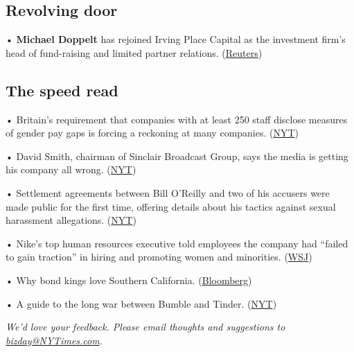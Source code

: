 \hypertarget{revolving-door}{%
\subsection{Revolving door}\label{revolving-door}}

• \textbf{Michael Doppelt} has rejoined Irving Place Capital as the
investment firm's head of fund-raising and limited partner relations.
(\href{https://www.reuters.com/article/us-irving-place-capital-moves-michael-do/irving-place-capital-names-fundraising-and-lp-relations-head-idUSKCN1HB21Q}{Reuters})

\hypertarget{the-speed-read}{%
\subsection{The speed read}\label{the-speed-read}}

• Britain's requirement that companies with at least 250 staff disclose
measures of gender pay gaps is forcing a reckoning at many companies.
(\href{https://www.nytimes3xbfgragh.onion/2018/04/04/business/britain-gender-pay-gap.html}{NYT})

• David Smith, chairman of Sinclair Broadcast Group, says the media is
getting his company all wrong.
(\href{https://www.nytimes3xbfgragh.onion/2018/04/04/business/media/sinclairs-boss-responds-to-criticism-you-cant-be-serious.html}{NYT})

• Settlement agreements between Bill O'Reilly and two of his accusers
were made public for the first time, offering details about his tactics
against sexual harassment allegations.
(\href{https://www.nytimes3xbfgragh.onion/2018/04/04/business/media/how-bill-oreilly-silenced-his-accusers.html}{NYT})

• Nike's top human resources executive told employees the company had
``failed to gain traction'' in hiring and promoting women and
minorities.
(\href{https://www.wsj.com/articles/nikes-hr-chief-says-company-fails-to-promote-enough-women-minoritiesmemo-1522871805}{WSJ})

• Why bond kings love Southern California.
(\href{https://www.bloomberg.com/news/features/2018-04-04/how-southern-california-became-home-to-bond-kings}{Bloomberg})

• A guide to the long war between Bumble and Tinder.
(\href{https://www.nytimes3xbfgragh.onion/2018/04/04/style/tinder-bumble-lawsuit-explainer.html}{NYT})

\emph{We'd love your feedback. Please email thoughts and suggestions to}
\href{mailto:bizday@NYTimes.com?subject=Newsletter\%20Feedback}{\emph{bizday@NYTimes.com}}\emph{.}

